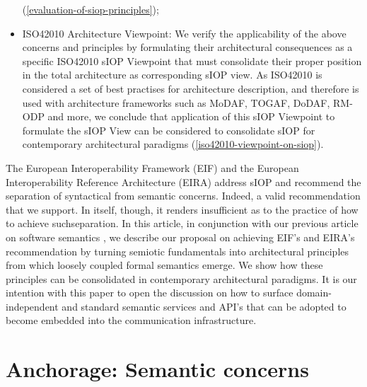 \documentclass[sort&compress,preprint,authoryear,3p,twocolumn]{elsarticle}
\begin{document}
\begin{itemize}
  (\cref{evaluation-of-siop-principles});
\item
  ISO42010 Architecture Viewpoint: We verify the applicability of the
  above concerns and principles by formulating their architectural
  consequences as a specific ISO42010 sIOP Viewpoint that must
  consolidate their proper position in the total architecture as
  corresponding sIOP view. As ISO42010 is considered a set of best
  practises for architecture description, and therefore is used with
  architecture frameworks such as MoDAF, TOGAF, DoDAF, RM-ODP and more,
  we conclude that application of this sIOP Viewpoint to formulate the
  sIOP View can be considered to consolidate sIOP for contemporary
  architectural paradigms (\cref{iso42010-viewpoint-on-siop}).
\end{itemize}

The European Interoperability Framework
(EIF)\citep{EuropeanCommissionDGInformatics-ISA2Programme2017} and the
European Interoperability Reference Architecture (EIRA)
\citep{EuropeanCommissionDGInformatics-ISA2Programme2019} address sIOP
and recommend the separation of syntactical from semantic concerns.
Indeed, a valid recommendation that we support. In itself, though, it
renders insufficient as to the practice of how to achieve
suchseparation. In this article, in conjunction with our previous
article on software semantics \citep{Brandt2021a}, we describe our
proposal on achieving EIF's and EIRA's recommendation by turning
semiotic fundamentals into architectural principles from which loosely
coupled formal semantics emerge. We show how these principles can be
consolidated in contemporary architectural paradigms. It is our
intention with this paper to open the discussion on how to surface
domain-independent and standard semantic services and API's that can be
adopted to become embedded into the communication infrastructure.

\hypertarget{anchorage-semantic-concerns}{%
\section{Anchorage: Semantic
concerns}\label{anchorage-semantic-concerns}}
\end{document}

